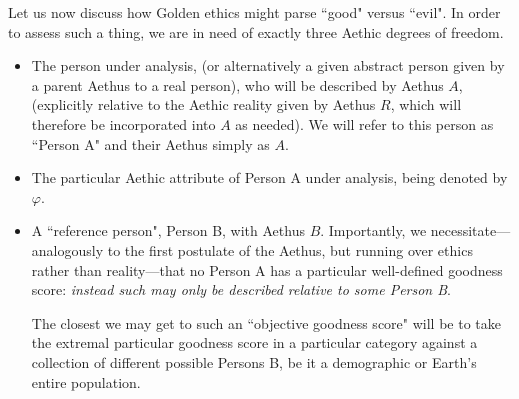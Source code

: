 Let us now discuss how Golden ethics might parse ``good" versus ``evil". In order to assess such a thing, we are in need of exactly three Aethic degrees of freedom.
\begin{itemize}
    \item The person under analysis, (or alternatively a given abstract person given by a parent Aethus to a real person), who will be described by Aethus $A$, (explicitly relative to the Aethic reality given by Aethus $R$, which will therefore be incorporated into $A$ as needed). We will refer to this person as ``Person A" and their Aethus simply as $A$. 
    \item The particular Aethic attribute of Person A under analysis, being denoted by $\varphi$.
    \item A ``reference person", Person B, with Aethus $B$. Importantly, we necessitate---analogously to the first postulate of the Aethus, but running over ethics rather than reality---that no Person A has a particular well-defined goodness score: \textit{instead such may only be described relative to some Person B}.
    
    The closest we may get to such an ``objective goodness score" will be to take the extremal particular goodness score in a particular category against a collection of different possible Persons B, be it a demographic or Earth's entire population. 
\end{itemize}


